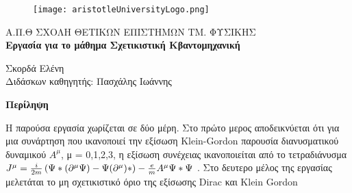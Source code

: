 \documentclass[12pt,oneside,titlepage,a4paper]{article}
\newcommand{\rbr}{
  \ensuremath{\right) }
}
\newcommand{\lbr}{
  \ensuremath{\left( }
}
\renewenvironment{abstract}[1][1.0]
{
	\begin{center}
		{\bf Περίληψη}\\[12pt]
		\begin{minipage}{#1\textwidth}
}
{
		\end{minipage}
	\end{center}
}
\begin{document}

\begin{titlepage}
	\begin{figure}[H]
		\centering
		\texttt{[image: aristotleUniversityLogo.png]}
	\end{figure}
	
	\begin{center}
		\large{{\sc Α.Π.Θ} ΣΧΟΛΗ ΘΕΤΙΚΩΝ ΕΠΙΣΤΗΜΩΝ ΤΜ. ΦΥΣΙΚΗΣ}\\[0.5cm]
		\LARGE\textbf{Εργασία για το μάθημα Σχετικιστική Κβαντομηχανική}\\[1.0cm] 

		\vspace{0.0cm}

		\small{Σκορδά Ελένη}\\[0.2cm]
               
		\small{Διδάσκων καθηγητής: Πασχάλης Ιωάννης }\\[0.2cm]

	\end{center}

	\begin{abstract}
	  Η παρούσα εργασία χωρίζεται σε δύο μέρη. Στο πρώτο μερος αποδεικνύεται ότι για μια συνάρτηση που ικανοποιεί την εξίσωση \textlatin{Klein-Gordon} παρουσία διανυσματικού δυναμικού $A^\mu$, μ = 0,1,2,3, η εξίσωση συνέχειας ικανοποιείται από το τετραδιάνυσμα $J^\mu =\frac{i}{2m} \lbr \Psi* (\partial^\mu \Psi)-\Psi(\partial^\mu)* \rbr - \frac{e}{m}A^\mu \Psi* \Psi$ . Στο δευτερο μέλος της εργασίας μελετάται το μη σχετικιστικό όριο της εξίσωσης \textlatin{Dirac} και \textlatin{Klein Gordon}  
          
	\end{abstract}
        
	\vfill

\end{titlepage}

\newpage


\tableofcontents
\newpage



\pagebreak

\pagebreak

\pagebreak
\end{document}
